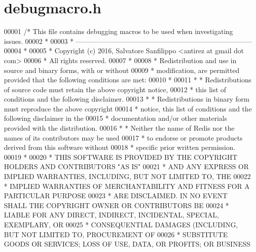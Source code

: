 \hypertarget{debugmacro_8h_source}{}\section{debugmacro.\+h}
\label{debugmacro_8h_source}

\begin{DoxyCode}
00001 \textcolor{comment}{/* This file contains debugging macros to be used when investigating issues.}
00002 \textcolor{comment}{ *}
00003 \textcolor{comment}{ * -----------------------------------------------------------------------------}
00004 \textcolor{comment}{ *}
00005 \textcolor{comment}{ * Copyright (c) 2016, Salvatore Sanfilippo <antirez at gmail dot com>}
00006 \textcolor{comment}{ * All rights reserved.}
00007 \textcolor{comment}{ *}
00008 \textcolor{comment}{ * Redistribution and use in source and binary forms, with or without}
00009 \textcolor{comment}{ * modification, are permitted provided that the following conditions are met:}
00010 \textcolor{comment}{ *}
00011 \textcolor{comment}{ *   * Redistributions of source code must retain the above copyright notice,}
00012 \textcolor{comment}{ *     this list of conditions and the following disclaimer.}
00013 \textcolor{comment}{ *   * Redistributions in binary form must reproduce the above copyright}
00014 \textcolor{comment}{ *     notice, this list of conditions and the following disclaimer in the}
00015 \textcolor{comment}{ *     documentation and/or other materials provided with the distribution.}
00016 \textcolor{comment}{ *   * Neither the name of Redis nor the names of its contributors may be used}
00017 \textcolor{comment}{ *     to endorse or promote products derived from this software without}
00018 \textcolor{comment}{ *     specific prior written permission.}
00019 \textcolor{comment}{ *}
00020 \textcolor{comment}{ * THIS SOFTWARE IS PROVIDED BY THE COPYRIGHT HOLDERS AND CONTRIBUTORS "AS IS"}
00021 \textcolor{comment}{ * AND ANY EXPRESS OR IMPLIED WARRANTIES, INCLUDING, BUT NOT LIMITED TO, THE}
00022 \textcolor{comment}{ * IMPLIED WARRANTIES OF MERCHANTABILITY AND FITNESS FOR A PARTICULAR PURPOSE}
00023 \textcolor{comment}{ * ARE DISCLAIMED. IN NO EVENT SHALL THE COPYRIGHT OWNER OR CONTRIBUTORS BE}
00024 \textcolor{comment}{ * LIABLE FOR ANY DIRECT, INDIRECT, INCIDENTAL, SPECIAL, EXEMPLARY, OR}
00025 \textcolor{comment}{ * CONSEQUENTIAL DAMAGES (INCLUDING, BUT NOT LIMITED TO, PROCUREMENT OF}
00026 \textcolor{comment}{ * SUBSTITUTE GOODS OR SERVICES; LOSS OF USE, DATA, OR PROFITS; OR BUSINESS}

\end{DoxyCode}
